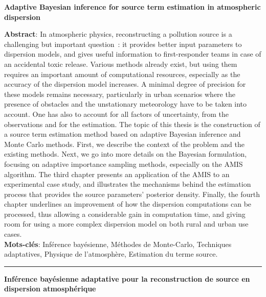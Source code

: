 \thispagestyle{plain}

\begin{flushright}
\textbf{{ Adaptive Bayesian inference for source term estimation in atmospheric dispersion}}
\end{flushright}
{\small \textbf{Abstract}: In atmospheric physics, reconstructing a pollution source is a challenging but important question : it provides better input parameters to dispersion models, and gives useful information to first-responder teams in case of an accidental toxic release.
Various methods already exist, but using them requires an important amount of computational resources, especially as the accuracy of the dispersion model increases. A minimal degree of precision for these models remains necessary, particularly in urban scenarios where the presence of obstacles and the unstationary meteorology have to be taken into account. One has also to account for all factors of uncertainty, from the observations and for the estimation. 
The topic of this thesis is the construction of a source term estimation method based on adaptive Bayesian inference and Monte Carlo methods. First, we describe the context of the problem and the existing methods. Next, we go into more details on the Bayesian formulation, focusing on adaptive importance sampling methods, especially on the AMIS algorithm. The third chapter presents an application of the AMIS to an experimental case study, and illustrates the mechanisms behind the estimation process that provides the source parameters’ posterior density. Finally, the fourth chapter underlines an improvement of how the dispersion computations can be processed, thus allowing a considerable gain in computation time, and giving room for using a more complex dispersion model on both rural and urban use cases. \\

\textbf{Mots-clés}: Inférence bayésienne, Méthodes de Monte-Carlo, Techniques adaptatives, Physique de l'atmosphère, Estimation du terme source. \\

}
\rule{\linewidth}{.5pt}
\begin{flushright}
	\textbf{{Inférence bayésienne adaptative pour la reconstruction de source en dispersion atmosphérique}}
\end{flushright}
